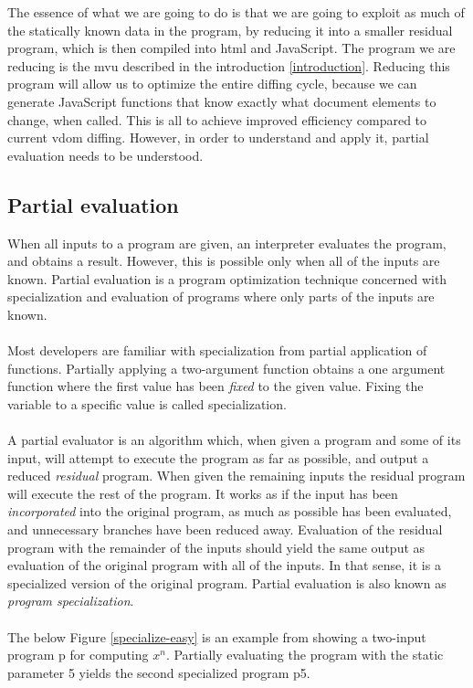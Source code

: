 The essence of what we are going to do is that we are going to exploit as much of the statically known data in the program, by reducing it into a smaller residual program, which is then compiled into \gls{html} and JavaScript. The program we are reducing is the \gls{mvu} described in the introduction \ref{introduction}. Reducing this program will allow us to optimize the entire diffing cycle, because we can generate JavaScript functions that know exactly what document elements to change, when called. This is all to achieve improved efficiency compared to current \gls{vdom} diffing. However, in order to understand and apply it, partial evaluation needs to be understood.

\subsection{Partial evaluation}
When all inputs to a program are given, an interpreter evaluates the program, and obtains a result. However, this is possible only when all of the inputs are known. 
Partial evaluation is a program optimization technique concerned with specialization and evaluation of programs where only parts of the inputs are known. 
\\\\
Most developers are familiar with specialization from partial application of functions. Partially applying a two-argument function obtains a one argument function where the first value has been \textit{fixed} to the given value. Fixing the variable to a specific value is called specialization. 
\\\\
A partial evaluator is an algorithm which, when given a program and some of its input, will attempt to execute the program as far as possible, and output a reduced \textit{residual} program. When given the remaining inputs the residual program will execute the rest of the program. It works as if the input has been \textit{incorporated} into the original program, as much as possible has been evaluated, and unnecessary branches have been reduced away. Evaluation of the residual program with the remainder of the inputs should yield the same output as evaluation of the original program with all of the inputs. In that sense, it is a specialized version of the original program. Partial evaluation is also known as \textit{program specialization}.
\\\\
The below Figure \ref{specialize-easy} is an example from \cite{Sestoft} showing a two-input program p for computing $x^n$. Partially evaluating the program with the static parameter 5 yields the second specialized program p5.

